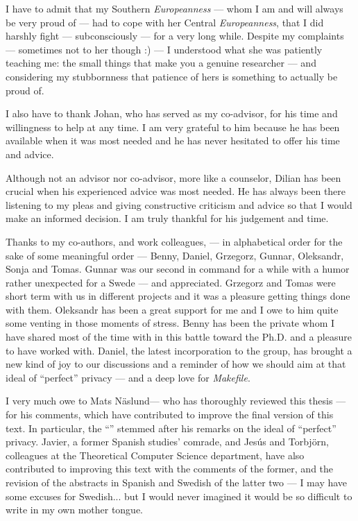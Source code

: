 I have to admit that my Southern \emph{Europeanness} --- whom I am and will always 
be very proud of --- had to cope with her Central \emph{Europeanness}, that I did 
harshly fight --- subconsciously --- for a very long while. Despite my complaints 
--- sometimes not to her though :) --- I understood what she was patiently teaching 
me: the small things that make you a genuine researcher --- and considering my stubbornness 
that patience of hers is something to actually be proud of.

I also have to thank Johan, who has served as my co-advisor, for his time and willingness 
to help at any time. I am very grateful to him because he has been available when 
it was most needed and he has never hesitated to offer his time and advice. 

Although not an advisor nor co-advisor, more like a counselor, Dilian has been crucial 
when his experienced advice was most needed. He has always been there listening 
to my pleas and giving constructive criticism and advice so that I would make an 
informed decision. I am truly thankful for his judgement and time.

Thanks to my co-authors, and work colleagues, --- in alphabetical order for the 
sake of some meaningful order --- Benny, Daniel, Grzegorz, Gunnar, Oleksandr, Sonja 
and Tomas. Gunnar was our second in command for a while with a humor rather unexpected 
for a Swede --- and appreciated. Grzegorz and Tomas were short term with us in different 
projects and it was a pleasure getting things done with them. Oleksandr has been 
a great support for me and I owe to him quite some venting in those moments of stress. 
Benny has been the private whom I have shared most of the time with in this battle toward 
the Ph.D. and a pleasure to have worked with. Daniel, the latest incorporation 
to the group, has brought a new kind of joy to our discussions and a reminder of 
how we should aim at that ideal of ``perfect'' privacy --- and a deep love for 
\emph{Makefile}.

I very much owe to Mats N\"{a}slund--- who has thoroughly reviewed this thesis --- 
for his comments, which have contributed to improve the final version of this text. 
In particular, the  ``'' 
stemmed after his remarks on the ideal of ``perfect'' privacy. Javier, a former 
Spanish studies' comrade, and Jes\'{u}s and Torbj\"{o}rn, colleagues at the Theoretical 
Computer Science department, have also contributed to improving this text with the 
comments of the former, and the revision of the abstracts in Spanish and Swedish 
of the latter two --- I may have some excuses for Swedish... but I would never imagined 
it would be so difficult to write in my own mother tongue. 

